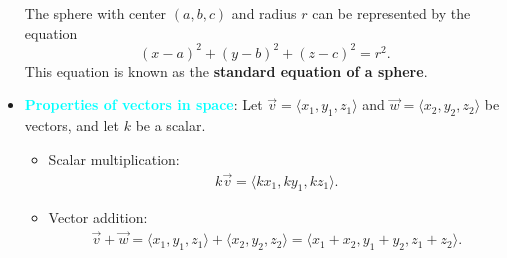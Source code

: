 \documentclass{report}
\begin{document}
\begin{itemize}
        The sphere with center $(a,b,c)$ and radius $r$ can be represented by the equation
        \[
            (x - a)^2 + (y - b)^2 + (z - c)^2 = r^2.
        \]
        This equation is known as the \textbf{standard equation of a sphere}.
    \item \textbf{\textcolor{cyan}{Properties of vectors in space}}:
        Let $\vec{v} = \langle x_1, y_1, z_1 \rangle$ and $\vec{w} = \langle x_2, y_2, z_2 \rangle$ be vectors, and let $k$ be a scalar.
        \begin{itemize}
            \item Scalar multiplication:
                \begin{align*}
                     k\vec{v} = \langle kx_1, ky_1, kz_1 \rangle
                .\end{align*}
            \item Vector addition: 
                \begin{align*}
                    \vec{v} + \vec{w} = \langle x_1, y_1, z_1 \rangle + \langle x_2, y_2, z_2 \rangle = \langle x_1 + x_2, y_1 + y_2, z_1 + z_2 \rangle
                .\end{align*}


\end{itemize}
\end{itemize}
\end{document}
